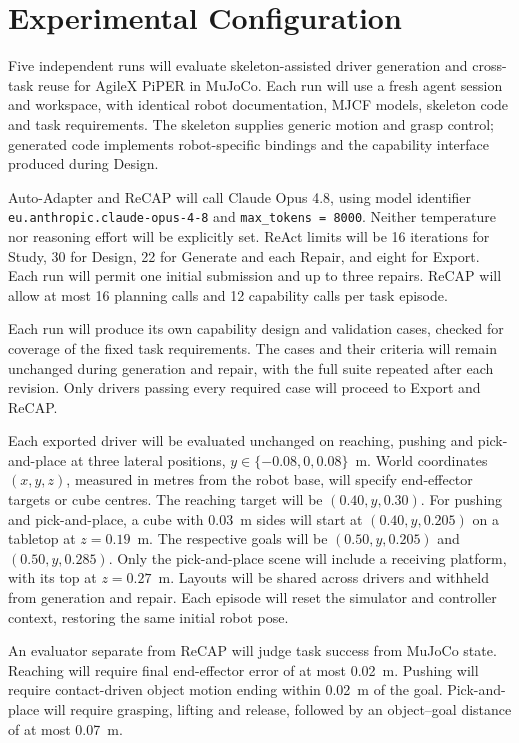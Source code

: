 \enlargethispage{\baselineskip}
\section{Experimental Configuration}


Five independent runs will evaluate skeleton-assisted driver generation and
cross-task reuse for AgileX PiPER in MuJoCo. Each run will use a fresh agent
session and workspace, with identical robot documentation, MJCF models,
skeleton code and task requirements. The skeleton supplies generic motion and
grasp control; generated code implements robot-specific bindings and the
capability interface produced during Design.

Auto-Adapter and ReCAP will call Claude Opus 4.8, using model identifier
\texttt{eu.anthropic.claude-opus-4-8} and \mbox{\texttt{max\_tokens = 8000}}.
Neither temperature nor reasoning effort will be explicitly set. ReAct limits
will be 16 iterations for Study, 30 for Design, 22 for Generate and each
Repair, and eight for Export. Each run will permit one initial submission and
up to three repairs. ReCAP will allow at most 16 planning calls and 12
capability calls per task episode.

Each run will produce its own capability design and validation cases, checked
for coverage of the fixed task requirements. The cases and their criteria will
remain unchanged during generation and repair, with the full suite repeated
after each revision. Only drivers passing every required case will proceed to
Export and ReCAP.

Each exported driver will be evaluated unchanged on reaching, pushing and
pick-and-place at three lateral positions, \(y\in\{-0.08,0,0.08\}\)~m.
World coordinates \((x,y,z)\), measured in metres from the robot base, will
specify end-effector targets or cube centres. The reaching target will be
\((0.40,y,0.30)\). For pushing and pick-and-place, a cube with 0.03~m sides
will start at \((0.40,y,0.205)\) on a tabletop at \(z=0.19\)~m. The
respective goals will be \((0.50,y,0.205)\) and \((0.50,y,0.285)\). Only
the pick-and-place scene will include a receiving platform, with its top at
\(z=0.27\)~m. Layouts will be shared across drivers and withheld from
generation and repair. Each episode will reset the simulator and controller
context, restoring the same initial robot pose.

An evaluator separate from ReCAP will judge task success from MuJoCo state.
Reaching will require final end-effector error of at most 0.02~m. Pushing will
require contact-driven object motion ending within 0.02~m of the goal.
Pick-and-place will require grasping, lifting and release, followed by an
object--goal distance of at most 0.07~m.

